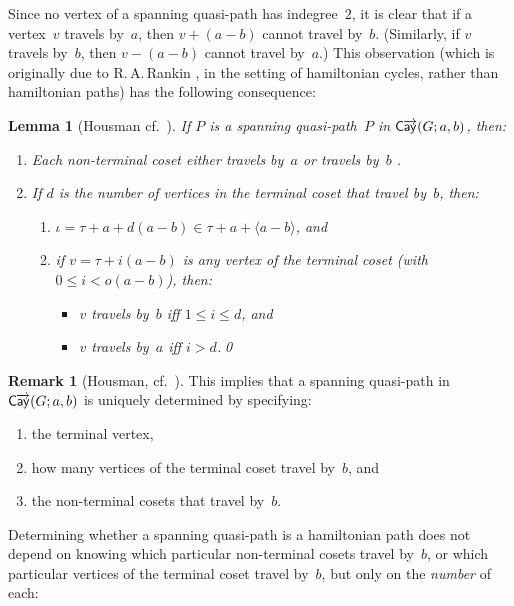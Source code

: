 \documentclass[11pt]{amsart}
\newtheorem{lem}[equation]{Lemma}
\theoremstyle{definition}
\newtheorem{remark}[equation]{Remark}
\numberwithin{case}{startcases}
\numberwithin{equation}{section}
\newcommand{\cayd}{\mathop{\mathsf{C}\mkern-1mu\overrightarrow{\mathsf{ay}}}}
\begin{document}
	Since no vertex of a spanning quasi-path has indegree~$2$, it is clear that if a vertex~$v$ travels by~$a$, then $v + (a - b)$ cannot travel by~$b$. (Similarly, if $v$ travels by~$b$, then $v - (a - b)$ cannot travel by~$a$.) This observation (which is originally due to R.\,A.\,Rankin \cite[Lem.~1]{Rankin}, in the setting of hamiltonian cycles, rather than hamiltonian paths) has the following consequence:
	
	\begin{lem}[Housman {cf.~\cite[pp.~82--83]{Housman}}] \label{arcforcing}
		If $P$ is a spanning quasi-path~$P$ in $\cayd(G; a,b)$, then:
		\begin{enumerate}
			\item \label{arcforcing-nonterminal}
			Each non-terminal coset either travels by~$a$ or travels by~$b$ .
			\item \label{arcforcing-terminal}
			If $d$ is the number of vertices in the terminal coset that travel by~$b$, then:
			\begin{enumerate}
				\item \label{arcforcing-terminal-iota}
				$\iota = \tau + a + d(a - b) \in \tau + a + \langle a - b \rangle$, and
				\item if $v = \tau + i(a - b)$ is any vertex of the terminal coset \textup(with $0 \le i < o(a - b)$\textup), then:
				\begin{itemize}
					\item $v$ travels by~$b$ iff $1 \le i \le d$, and
					\item $v$ travels by~$a$ iff $i > d$.\qed
				\end{itemize}
			\end{enumerate}
		\end{enumerate}
	\end{lem}
	
	\begin{remark}[Housman, cf.\ {\cite[proof of Thm.~1]{Housman}}]
		This implies that a spanning quasi-path in $\cayd(G;a,b)$ is uniquely determined by specifying:
		\begin{enumerate}
			\item the terminal vertex,
			\item how many vertices of the terminal coset travel by~$b$,
			and
			\item the non-terminal cosets that travel by~$b$.
		\end{enumerate}
	\end{remark}
	
	Determining whether a spanning quasi-path is a hamiltonian path does not depend on knowing which particular non-terminal cosets travel by~$b$, or which particular vertices of the terminal coset travel by~$b$, but only on the \emph{number} of each:
	
\end{document}
